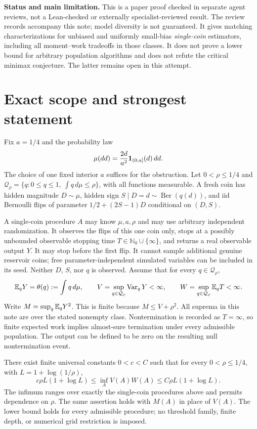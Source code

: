 


\noindent\textbf{Status and main limitation.} This is a paper proof checked in
separate agent reviews, not a Lean-checked or externally specialist-reviewed
result. The review records accompany this note; model diversity is not
guaranteed. It gives matching characterizations for unbiased and uniformly
small-bias \emph{single-coin} estimators, including all moment--work tradeoffs
in those classes. It does not prove a lower
bound for arbitrary population algorithms and does not refute the critical
minimax conjecture. The latter remains open in this attempt.

\section{Exact scope and strongest statement}
Fix $a=1/4$ and the probability law
\[
 \mu(dd)=\frac{2d}{a^2}\mathbf1_{(0,a]}(d)\,dd.
\]
The choice of one fixed interior $a$ suffices for the obstruction. Let
$0<\rho\le1/4$ and
$\mathcal Q_\rho=\{q:0\le q\le1,\ \int q\,d\mu\le\rho\}$,
with all functions measurable. A fresh coin has hidden magnitude $D\sim\mu$,
hidden sign $S\mid D=d\sim\operatorname{Ber}(q(d))$, and iid Bernoulli flips
of parameter $1/2+(2S-1)D$ conditional on $(D,S)$.

A single-coin procedure $A$ may know $\mu,a,\rho$ and may use arbitrary
independent randomization. It observes the flips of this one coin only,
stops at a possibly unbounded observable stopping time
$T\in\mathbb N_0\cup\{\infty\}$, and returns a real
observable output $Y$. It may stop before the first flip. It cannot sample
additional genuine reservoir coins; free parameter-independent simulated
variables can be included in its seed. Neither $D$, $S$, nor $q$ is observed.
Assume that for every $q\in\mathcal Q_\rho$,
\[
 \mathbb E_qY=\theta(q):=\int q\,d\mu,
 \qquad
 V=\sup_{q\in\mathcal Q_\rho}\operatorname{Var}_qY<\infty,
 \qquad
 W=\sup_{q\in\mathcal Q_\rho}\mathbb E_qT<\infty.
\]
Write $M=\sup_q\mathbb E_qY^2$. This is finite because $M\le V+\rho^2$.
All suprema in this note are over the stated nonempty class.
Nontermination is recorded as $T=\infty$, so finite expected work implies
almost-sure termination under every admissible population. The output can be
defined to be zero on the resulting null nontermination event.

\begin{theorem}\label{thm:main}
There exist finite universal constants $0<c<C$ such that for every
$0<\rho\le1/4$, with $L=1+\log(1/\rho)$,
\[
 c\rho L(1+\log L)
 \le \inf_A V(A)W(A)
 \le C\rho L(1+\log L).                                  \tag{1}
\]
The infimum ranges over exactly the single-coin procedures above and permits
dependence on $\rho$. The same assertion holds with $M(A)$ in place of $V(A)$.
The lower bound holds for every admissible procedure; no threshold family,
finite depth, or numerical grid restriction is imposed.
\end{theorem}

